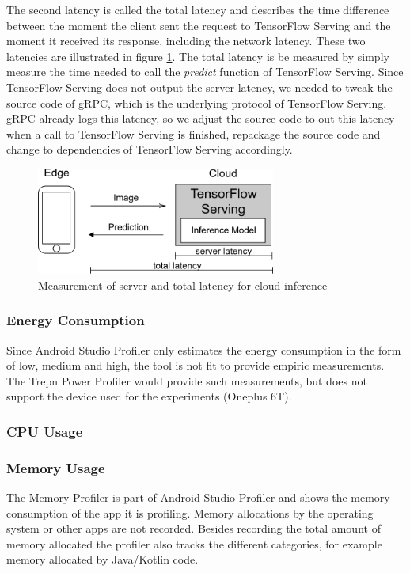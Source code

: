 The second latency is called the total latency and describes the time difference between the moment the client sent the request to TensorFlow Serving and the moment it received its response, including the network latency.
These two latencies are illustrated in figure \ref{fig:serverLat}.
The total latency is be measured by simply measure the time needed to call the \emph{predict} function of TensorFlow Serving.
Since TensorFlow Serving does not output the server latency, we needed to tweak the source code of gRPC, which is the underlying protocol of TensorFlow Serving. gRPC already logs this latency, so we adjust the source code to out this latency when a call to TensorFlow Serving is finished, repackage the source code and change to dependencies of TensorFlow Serving accordingly.
\begin{figure}[H]
\centering
\includegraphics[width=0.7\textwidth]{./Bilder/server_latency.png}
\caption{Measurement of server and total latency for cloud inference}
\label{fig:serverLat}
\end{figure}
\subsubsection{Energy Consumption}
Since Android Studio Profiler only estimates the energy consumption in the form of low, medium and high, the tool is not fit to provide empiric measurements. The Trepn Power Profiler would provide such measurements, but does not support the device used for the experiments (Oneplus 6T).
\subsubsection{CPU Usage}

\subsubsection{Memory Usage}
The Memory Profiler is part of Android Studio Profiler and shows the memory consumption of the app it is profiling. Memory allocations by the operating system or other apps are not recorded. Besides recording the total amount of memory allocated the profiler also tracks the different categories, for example memory allocated by Java/Kotlin code.
